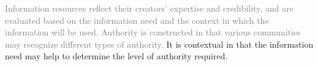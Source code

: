 \documentclass[17pt]{extarticle}
\begin{document}
{{\begin{center}
\end{center}

}

\newpage


{\Huge

  \begin{center}

\textcolor{gray}{Information resources reflect their creators’ expertise and credibility, and are evaluated based on the information need and the context in which the information will be used. Authority is constructed in that various communities may recognize different types of authority.} It is contextual in that the information need may help to determine the level of authority required.

\end{center}

}

\newpage


\vspace*{1in}

{\Huge

\begin{center}

   \\
  \vspace{1in}
   \\
  \vspace{1in}

\end{center}

\newpage


}}
\end{document}

